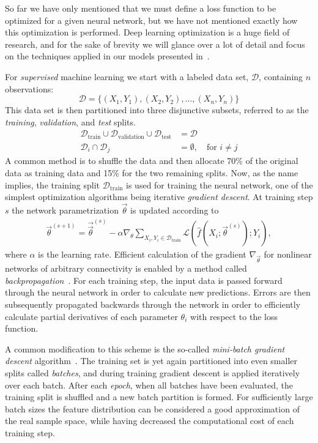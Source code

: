 So far we have only mentioned that we must define a loss function to be optimized for a given neural network, but we have not mentioned exactly how this optimization is performed.
Deep learning optimization is a huge field of research, and for the sake of brevity we will glance over a lot of detail and focus on the techniques applied in our models presented in~.

For \textit{supervised} machine learning we start with a labeled data set, $\mathcal{D}$, containing $n$ observations:
%
\begin{equation*}
  \mathcal{D} = \{(X_1, Y_1), (X_2, Y_2), \ldots, (X_n, Y_n)\}
\end{equation*}
%
This data set is then partitioned into three disjunctive subsets, referred to as the \textit{training}, \textit{validation}, and \textit{test} splits.
%
\begin{align*}
  \mathcal{D}_{\mathrm{train}} \cup \mathcal{D}_{\mathrm{validation}} \cup \mathcal{D}_{\mathrm{test}} &= \mathcal{D}\\
  \mathcal{D}_i \cap \mathcal{D}_j &= \emptyset,~~~\text{ for } i \neq j
\end{align*}
%
A common method is to shuffle the data and then allocate 70\% of the original data as training data and 15\% for the two remaining splits.
Now, as the name implies, the training split $\mathcal{D}_{\mathrm{train}}$ is used for training the neural network, one of the simplest optimization algorithms being iterative \textit{gradient descent}.
At training step $s$ the network parametrization $\vec{\theta}$ is updated according to
%
\begin{align*}
  \vec{\theta}^{(s + 1)}
  =
    \vec{\vec{\theta}}^{(s)}
    -
    \alpha \nabla_{\theta}
      \sum_{X_i, Y_i \in \mathcal{D}_{\mathrm{train}}}
      \mathcal{L}(\hat{f}(X_i; \vec{\theta}^{(s)}); Y_i)
  ,
\end{align*}
%
where $\alpha$ is the learning rate.
Efficient calculation of the gradient $\nabla_{\vec{\theta}}$ for nonlinear networks of arbitrary connectivity is enabled by a method called \textit{backpropagation}~\cite{backpropagation}.
For each training step, the input data is passed forward through the neural network in order to calculate new predictions.
Errors are then subsequently propagated backwards through the network in order to efficiently calculate partial derivatives of each parameter $\theta_i$ with respect to the loss function.

A common modification to this scheme is the so-called \textit{mini-batch gradient descent} algorithm~\cite{gradient-descent}.
The training set is yet again partitioned into even smaller splits called \textit{batches}, and during training gradient descent is applied iteratively over each batch.
After each \textit{epoch}, when all batches have been evaluated, the training split is shuffled and a new batch partition is formed.
For sufficiently large batch sizes the feature distribution can be considered a good approximation of the real sample space, while having decreased the computational cost of each training step.

